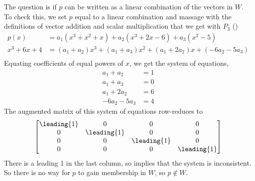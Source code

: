 The question is if $p$ can be written as a linear combination of the vectors in $W$.  To check this, we set $p$ equal to a linear combination and massage with the definitions of vector addition and scalar multiplication that we get with $P_3$ ()
%
\begin{align*}
p(x)&=a_1(x^3+x^2+x)+a_2(x^3+2x-6)+a_3(x^2-5)\\
x^3+6x+4&=(a_1+a_2)x^3+(a_1+a_3)x^2+(a_1+2a_2)x+(-6a_2-5a_3)\\
\end{align*}
%
Equating coefficients of equal powers of $x$, we get the system of equations,
%
\begin{align*}
a_1+a_2&=1\\
a_1+a_3&=0\\
a_1+2a_2&=6\\
-6a_2-5a_3&=4
\end{align*}
%
The augmented matrix of this system of equations row-reduces to
%
\begin{equation*}
\begin{bmatrix}
\leading{1} & 0 & 0 & 0\\
0 & \leading{1} & 0 & 0\\
0 & 0 & \leading{1} & 0\\
0 & 0 & 0 & \leading{1}
\end{bmatrix}
\end{equation*}
%
There is a leading 1 in the last column, so  implies that the system is inconsistent.  So there is no way for $p$ to gain membership in $W$, so $p\not\in W$.